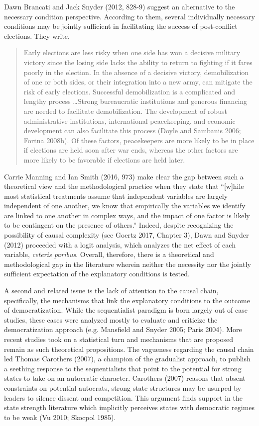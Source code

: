 \documentclass [11pt]{article}
\begin{document}
Dawn Brancati and Jack Snyder (2012, 828-9) suggest an alternative to the necessary condition perspective. According to them, several individually necessary conditions may be jointly sufficient in facilitating the success of post-conflict elections. They write,

\begin{quote}
\small
Early elections are less risky when one side has won a decisive military victory since the losing side lacks the ability to return to fighting if it fares poorly in the election. In the absence of a decisive victory, demobilization of one or both sides, or their integration into a new army, can mitigate the risk of early elections. Successful demobilization is a complicated and lengthy process \dots Strong bureaucratic institutions and generous financing are needed to facilitate demobilization. The development of robust administrative institutions, international peacekeeping, and economic development can also facilitate this process (Doyle and Sambanis 2006; Fortna 2008b). Of these factors, peacekeepers are more likely to be in place if elections are held soon after war ends, whereas the other factors are more likely to be favorable if elections are held later.
\end{quote}

Carrie Manning and Ian Smith (2016, 973) make clear the gap between such a theoretical view and the methodological practice when they state that ``[w]hile most statistical treatments assume that independent variables are largely independent of one another, we know that empirically the variables we identify are linked to one another in complex ways, and the impact of one factor is likely to be contingent on the presence of others.'' Indeed, despite recognizing the possibility of causal complexity (see Goertz 2017, Chapter 3), Dawn and Snyder (2012) proceeded with a logit analysis, which analyzes the net effect of each variable, \emph{ceteris paribus}. Overall, therefore, there is a theoretical and methodological gap in the literature wherein neither the necessity nor the jointly sufficient expectation of the explanatory conditions is tested.

A second and related issue is the lack of attention to the causal chain, specifically, the mechanisms that link the explanatory conditions to the outcome of democratization. While the sequentialist paradigm is born largely out of case studies, these cases were analyzed mostly to evaluate and criticize the democratization approach (e.g. Mansfield and Snyder 2005; Paris 2004). More recent studies took on a statistical turn and mechanisms that are proposed remain as such theoretical propositions. The vagueness regarding the causal chain led Thomas Carothers (2007), a champion of the gradualist approach, to publish a seething response to the sequentialists that point to the potential for strong states to take on an autocratic character. Carothers (2007) reasons that absent constraints on potential autocrats, strong state structures may be usurped by leaders to silence dissent and competition. This argument finds support in the state strength literature which implicitly perceives states with democratic regimes to be weak (Vu 2010; Skocpol 1985).
\end{document}
